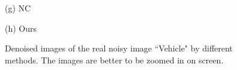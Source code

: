 \documentclass[10pt,onecolumn,letterpaper]{article}
\begin{document}
\begin{figure}[H]
{\begin{minipage}[t]{0.244\textwidth}
\end{minipage}
\begin{minipage}[t]{0.244\textwidth}
\centering
{}
{\footnotesize (g) NC \cite{ncwebsite,noiseclinic}   }
\end{minipage}
\begin{minipage}[t]{0.244\textwidth}
\centering
{}
{\footnotesize (h) Ours  }
\end{minipage}
}
\caption{Denoised images of the real noisy image ``Vehicle" \cite{ncwebsite} by different methods. The images are better to be zoomed in on screen.}
\label{fig4}
\end{figure}
\end{document}
